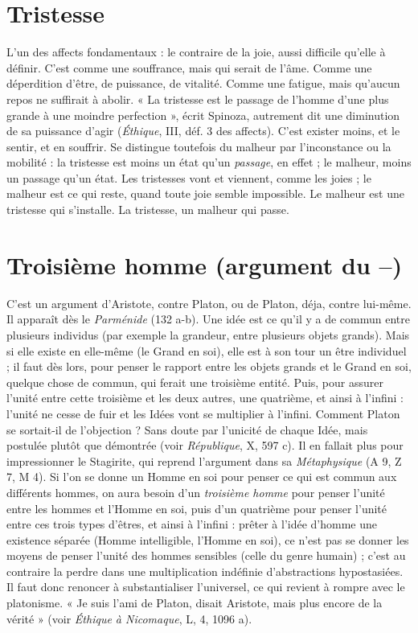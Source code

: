 \section{Tristesse}
L'un des affects fondamentaux : le contraire de la joie, aussi difficile
qu’elle à définir. C’est comme une souffrance, mais qui
serait de l’âme. Comme une déperdition d’être, de puissance, de vitalité. Comme
une fatigue, mais qu'aucun repos ne suffirait à abolir. « La tristesse est le passage
de l’homme d’une plus grande à une moindre perfection », écrit Spinoza, autrement
dit une diminution de sa puissance d’agir ({\it Éthique}, III, déf. 3 des affects).
C'est exister moins, et le sentir, et en souffrir. Se distingue toutefois du malheur
par l’inconstance ou la mobilité : la tristesse est moins un état qu’un {\it passage}, en
effet ; le malheur, moins un passage qu’un état. Les tristesses vont et viennent,
comme les joies ; le malheur est ce qui reste, quand toute joie semble impossible.
Le malheur est une tristesse qui s’installe. La tristesse, un malheur qui passe.

\section{Troisième homme (argument du {\bf --})}
C’est un argument d’Aristote,
contre Platon, ou de
Platon, déja, contre lui-même. Il apparaît dès le {\it Parménide} (132 a-b). Une idée
est ce qu’il y a de commun entre plusieurs individus (par exemple la grandeur,
entre plusieurs objets grands). Mais si elle existe en elle-même (le Grand en soi),
elle est à son tour un être individuel ; il faut dès lors, pour penser le rapport entre
les objets grands et le Grand en soi, quelque chose de commun, qui ferait une
troisième entité. Puis, pour assurer l’unité entre cette troisième et les deux autres,
une quatrième, et ainsi à l'infini : l'unité ne cesse de fuir et les Idées vont se multiplier
à l'infini. Comment Platon se sortait-il de l’objection ? Sans doute par
l’unicité de chaque Idée, mais postulée plutôt que démontrée (voir {\it République}, X,
597 c). Il en fallait plus pour impressionner le Stagirite, qui reprend l’argument
dans sa {\it Métaphysique} (A 9, Z 7, M 4). Si l’on se donne un Homme en soi pour
penser ce qui est commun aux différents hommes, on aura besoin d’un {\it troisième
homme} pour penser l’unité entre les hommes et l'Homme en soi, puis d’un quatrième
pour penser l’unité entre ces trois types d’êtres, et ainsi à l'infini : prêter à
l’idée d’homme une existence séparée (Homme intelligible, l'Homme en soi), ce
n’est pas se donner les moyens de penser l’unité des hommes sensibles (celle du
genre humain) ; c’est au contraire la perdre dans une multiplication indéfinie
d’abstractions hypostasiées. Il faut donc renoncer à substantialiser l’universel, ce
qui revient à rompre avec le platonisme. « Je suis l'ami de Platon, disait Aristote,
mais plus encore de la vérité » (voir {\it Éthique à Nicomaque}, L, 4, 1096 a).

